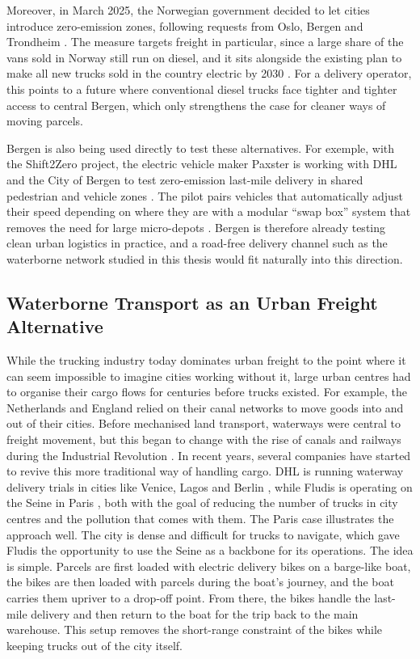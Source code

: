 \documentclass[12pt]{article}
\begin{document}
Moreover, in March 2025, the Norwegian government decided to let cities introduce zero-emission zones, following requests from Oslo, Bergen and Trondheim \parencite{energymix_zez}. The measure targets freight in particular, since a large share of the vans sold in Norway still run on diesel, and it sits alongside the existing plan to make all new trucks sold in the country electric by 2030 \parencite{energymix_zez}. For a delivery operator, this points to a future where conventional diesel trucks face tighter and tighter access to central Bergen, which only strengthens the case for cleaner ways of moving parcels.

Bergen is also being used directly to test these alternatives. For exemple, with the Shift2Zero project, the electric vehicle maker Paxster is working with DHL and the City of Bergen to test zero-emission last-mile delivery in shared pedestrian and vehicle zones \parencite{paxster_shift2zero}. The pilot pairs vehicles that automatically adjust their speed depending on where they are with a modular ``swap box'' system that removes the need for large micro-depots \parencite{paxster_shift2zero}. Bergen is therefore already testing clean urban logistics in practice, and a road-free delivery channel such as the waterborne network studied in this thesis would fit naturally into this direction.

\subsection{Waterborne Transport as an Urban Freight Alternative}
\label{subsec:waterborne-urban-freight}

While the trucking industry today dominates urban freight to the point where it can seem impossible to imagine cities working without it, large urban centres had to organise their cargo flows for centuries before trucks existed. For example, the Netherlands and England relied on their canal networks to move goods into and out of their cities. Before mechanised land transport, waterways were central to freight movement, but this began to change with the rise of canals and railways during the Industrial Revolution \parencite{rodrigue2024emergence}. In recent years, several companies have started to revive this more traditional way of handling cargo. DHL is running waterway delivery trials in cities like Venice, Lagos and Berlin \parencite{dhlboats}, while Fludis is operating on the Seine in Paris \parencite{fludis}, both with the goal of reducing the number of trucks in city centres and the pollution that comes with them. The Paris case illustrates the approach well. The city is dense and difficult for trucks to navigate, which gave Fludis the opportunity to use the Seine as a backbone for its operations. The idea is simple. Parcels are first loaded with electric delivery bikes on a barge-like boat, the bikes are then loaded with parcels during the boat's journey, and the boat carries them upriver to a drop-off point. From there, the bikes handle the last-mile delivery and then return to the boat for the trip back to the main warehouse. This setup removes the short-range constraint of the bikes while keeping trucks out of the city itself.
\end{document}
